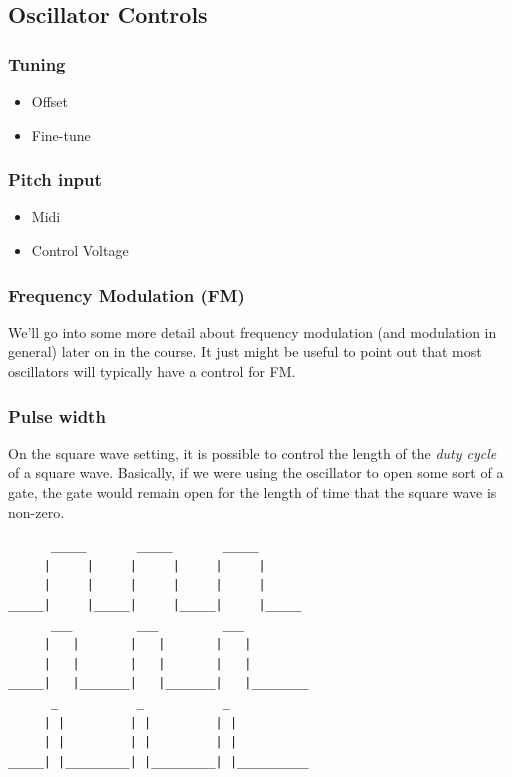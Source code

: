 \documentclass[11pt]{article}
\begin{document}
\subsection{Oscillator Controls}
\label{sec:org2435c6e}
\subsubsection{Tuning}
\label{sec:orga202cf7}
\begin{itemize}
\item Offset
\item Fine-tune
\end{itemize}

\subsubsection{Pitch input}
\label{sec:org5469dfb}
\begin{itemize}
\item Midi
\item Control Voltage
\end{itemize}

\subsubsection{Frequency Modulation (FM)}
\label{sec:orgf8e919b}
We'll go into some more detail about frequency modulation (and
modulation in general) later on in the course. It just might be
useful to point out that most oscillators will typically have a
control for FM.

\subsubsection{Pulse width}
\label{sec:orgd2103d3}
On the square wave setting, it is possible to control the length of
the \emph{duty cycle} of a square wave. Basically, if we were using the
oscillator to open some sort of a gate, the gate would remain open for
the length of time that the square wave is non-zero. 

\begin{verbatim}
      _____       _____       _____
     |     |     |     |     |     |
     |     |     |     |     |     |
_____|     |_____|     |_____|     |_____
      ___         ___         ___
     |   |       |   |       |   |
     |   |       |   |       |   |
_____|   |_______|   |_______|   |________
      _           _           _
     | |         | |         | |
     | |         | |         | |
_____| |_________| |_________| |__________

\end{verbatim}
\end{document}
